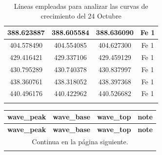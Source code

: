 \documentclass[12pt,oneside,openany,letter]{book}
\begin{document}
\begin{longtable}[]{|c|c|c|c|}
388.623887 & 388.605584 & 388.636090 & Fe 1 \\ \hline
404.578490 & 404.554085 & 404.627300 & Fe 1 \\ \hline
429.416421 & 429.337106 & 429.459129 & Fe 1 \\ \hline
430.795289 & 430.740378 & 430.837997 & Fe 1 \\ \hline
438.360761 & 438.318052 & 438.397368 & Fe 1 \\ \hline
440.496176 & 440.422962 & 440.526682 & Fe 1 \\ \hline
\caption{Líneas empleadas para analizar las curvas de crecimiento del 24 Octubre}
\label{table:lines}
\end{longtable}

\begin{longtable}{|r|r|r|r|}
\hline
\textbf{wave\_peak}                       & \textbf{wave\_base}             & \textbf{wave\_top}              & \textbf{note}             \\ \hline
\endfirsthead

\hline
\textbf{wave\_peak}                       & \textbf{wave\_base}             & \textbf{wave\_top}              & \textbf{note}             \\ \hline
\endhead

\multicolumn{4}{c}{Continua en la página siguiente.}
\endfoot


\multicolumn{4}{c}{ }\\
\endlastfoot


\end{longtable}
\end{document}
